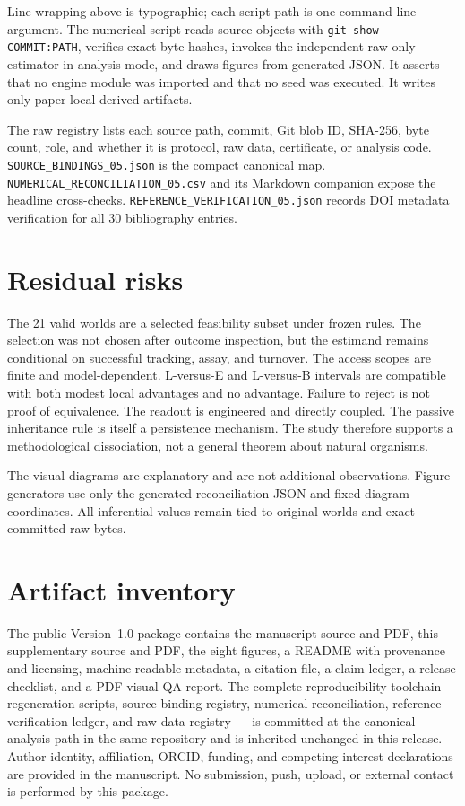 \documentclass[10pt]{article}
\newcommand{\code}[1]{\texttt{#1}}
\begin{document}
Line wrapping above is typographic; each script path is one command-line argument. The numerical script reads source objects with \code{git show COMMIT:PATH}, verifies exact byte hashes, invokes the independent raw-only estimator in analysis mode, and draws figures from generated JSON. It asserts that no engine module was imported and that no seed was executed. It writes only paper-local derived artifacts.

The raw registry lists each source path, commit, Git blob ID, SHA-256, byte count, role, and whether it is protocol, raw data, certificate, or analysis code. \code{SOURCE\_BINDINGS\_05.json} is the compact canonical map. \code{NUMERICAL\_RECONCILIATION\_05.csv} and its Markdown companion expose the headline cross-checks. \code{REFERENCE\_VERIFICATION\_05.json} records DOI metadata verification for all 30 bibliography entries.

\section{Residual risks}

The 21 valid worlds are a selected feasibility subset under frozen rules. The selection was not chosen after outcome inspection, but the estimand remains conditional on successful tracking, assay, and turnover. The access scopes are finite and model-dependent. L-versus-E and L-versus-B intervals are compatible with both modest local advantages and no advantage. Failure to reject is not proof of equivalence. The readout is engineered and directly coupled. The passive inheritance rule is itself a persistence mechanism. The study therefore supports a methodological dissociation, not a general theorem about natural organisms.

The visual diagrams are explanatory and are not additional observations. Figure generators use only the generated reconciliation JSON and fixed diagram coordinates. All inferential values remain tied to original worlds and exact committed raw bytes.

\section{Artifact inventory}

The public Version~1.0 package contains the manuscript source and PDF, this supplementary source and PDF, the eight figures, a README with provenance and licensing, machine-readable metadata, a citation file, a claim ledger, a release checklist, and a PDF visual-QA report. The complete reproducibility toolchain --- regeneration scripts, source-binding registry, numerical reconciliation, reference-verification ledger, and raw-data registry --- is committed at the canonical analysis path in the same repository and is inherited unchanged in this release. Author identity, affiliation, ORCID, funding, and competing-interest declarations are provided in the manuscript. No submission, push, upload, or external contact is performed by this package.
\end{document}
